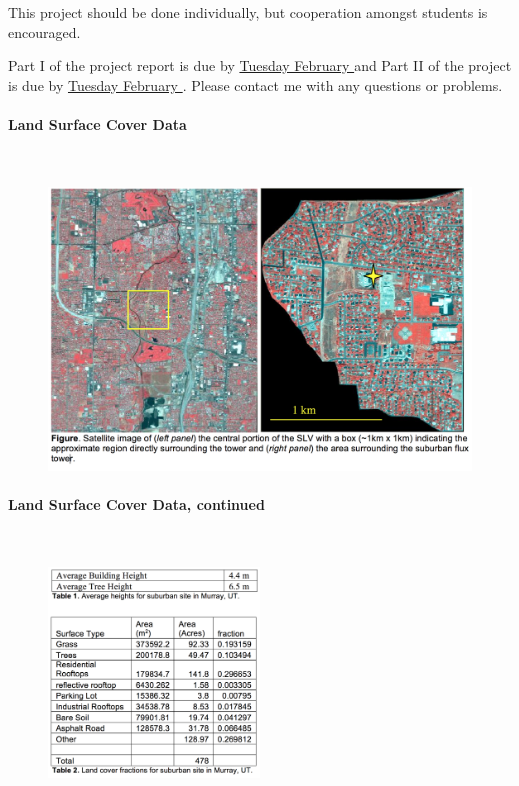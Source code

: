 \documentclass[11pt]{article}
\begin{document}
\noindent This project should be done individually, but cooperation amongst students is encouraged.

\noindent Part I of the project report is due by \underline{Tuesday February } and Part II of the project is due by \underline{Tuesday February }.  Please contact me with any questions or problems.

\paragraph{\large Land Surface Cover Data}~\\
\begin{figure}[H]
	\includegraphics[width=1\textwidth]{fig1}
\end{figure}

\paragraph{\large Land Surface Cover Data, continued}~\\
\begin{figure}[H]
	\centering
	\includegraphics[width=0.5\textwidth]{fig2}
\end{figure}
\end{document}
